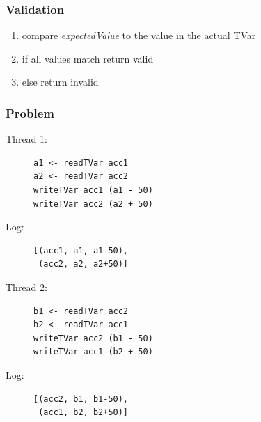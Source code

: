 \documentclass{beamer}
\begin{document}
  \begin{frame}
   \frametitle{Validation}
    \begin{enumerate}\setlength\itemsep{1em}
      \item compare \textit{expectedValue} to the value in the actual TVar
      \item if all values match return valid 
      \item else return invalid
    \end{enumerate}
  \end{frame}


\begin{frame}[fragile]
    \frametitle{Problem}
    \fboxsep=0pt
    \noindent
    \begin{minipage}[t]{0.48\linewidth}
      Thread 1:
    \begin{figure}
     \begin{lstlisting}[frame=single]
a1 <- readTVar acc1
a2 <- readTVar acc2
writeTVar acc1 (a1 - 50)
writeTVar acc2 (a2 + 50)
     \end{lstlisting}
    \end{figure}
    Log:
    \begin{figure}
     \begin{lstlisting}[frame=single]
[(acc1, a1, a1-50),
 (acc2, a2, a2+50)]
     \end{lstlisting}
    \end{figure}
    \end{minipage}%
    \hfill%
    \begin{minipage}[t]{0.48\linewidth}
      Thread 2:
    \begin{figure}
     \begin{lstlisting}[frame=single]
b1 <- readTVar acc2
b2 <- readTVar acc1
writeTVar acc2 (b1 - 50)
writeTVar acc1 (b2 + 50)
     \end{lstlisting}
    \end{figure}
Log:
    \begin{figure}
     \begin{lstlisting}[frame=single]
[(acc2, b1, b1-50),
 (acc1, b2, b2+50)]
    \end{lstlisting}
    \end{figure}
    \end{minipage}
\end{frame}
\end{document}
